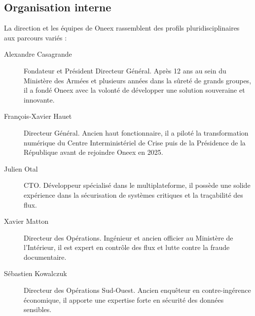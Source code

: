 \subsection{Organisation interne}

La direction et les équipes de Oneex rassemblent des profils pluridisciplinaires aux parcours variés :

\begin{description}
	\item[Alexandre Casagrande] Fondateur et Président Directeur Général. Après 12 ans au sein du Ministère des Armées et plusieurs années dans la sûreté de grands groupes, il a fondé Oneex avec la volonté de développer une solution souveraine et innovante.

	\item[François-Xavier Hauet] Directeur Général. Ancien haut fonctionnaire, il a piloté la transformation numérique du Centre Interministériel de Crise puis de la Présidence de la République avant de rejoindre Oneex en 2025.

	\item[Julien Otal] CTO. Développeur spécialisé dans le multiplateforme, il possède une solide expérience dans la sécurisation de systèmes critiques et la traçabilité des flux.

	\item[Xavier Matton] Directeur des Opérations. Ingénieur et ancien officier au Ministère de l’Intérieur, il est expert en contrôle des flux et lutte contre la fraude documentaire.


	\item[Sébastien Kowalczuk] Directeur des Opérations Sud-Ouest. Ancien enquêteur en contre-ingérence économique, il apporte une expertise forte en sécurité des données sensibles.
\end{description}

